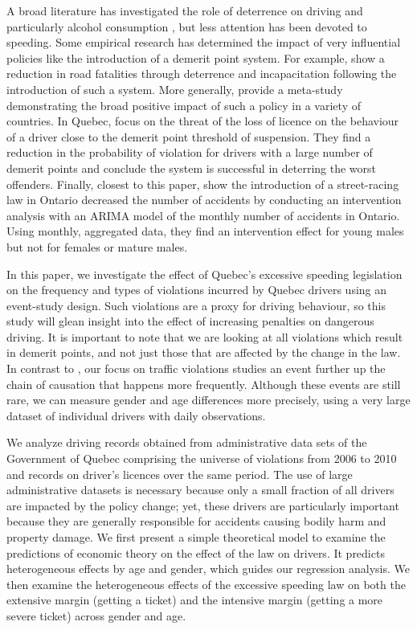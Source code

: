 \documentclass{cje}
\begin{document}
A broad literature has investigated the role of deterrence on driving 
and particularly alcohol consumption 
\citep[e.g.][]{hansen2015}, 
but less attention has been devoted to speeding. 
Some empirical research has determined the impact of very influential policies 
like the introduction of a demerit point system. 
For example, 
\citet{bennedittiniNicita2009} 
show a reduction in road fatalities 
through deterrence and incapacitation following the introduction of such a system. 
More generally, 
\citet{castillocastro2012} 
provide a meta-study 
demonstrating the broad positive impact of such a policy in a variety of countries. 
In Quebec, 
\citet{dionneetal2011} 
focus on the threat of the loss of licence 
on the behaviour of a driver close to the demerit point threshold of suspension. 
They find a reduction in the probability of violation for drivers 
with a large number of demerit points and conclude 
the system is successful in deterring the worst offenders. 
Finally, closest to this paper, 
\citet{meirambayeva2014} 
show the introduction of a street-racing law in Ontario decreased the number of accidents 
by conducting an intervention analysis with an ARIMA model of 
the monthly number of accidents in Ontario.
%
Using monthly, aggregated data, 
they find an intervention effect for young males
but not for females or mature males. 


In this paper, we investigate the effect of Quebec’s excessive speeding legislation
on the frequency and types of violations incurred by Quebec drivers 
using an event-study design. 
Such violations are a proxy for driving behaviour, 
so this study will glean insight into the effect of increasing penalties on dangerous driving. 
It is important to note that we are looking at all violations which result in demerit points, 
and not just those that are affected by the change in the law. 
% 
In contrast to \citet{meirambayeva2014}, 
our focus on traffic violations
studies an event further up the chain of causation that happens more frequently. 
Although these events are still rare,
we can measure gender and age differences more precisely, 
using a very large dataset of individual drivers with daily observations. 

We analyze driving records obtained from administrative data sets 
of the Government of Quebec comprising the universe of violations 
from 2006 to 2010 and records on driver's licences over the same period. 
The use of large administrative datasets is necessary because only a small fraction 
of all drivers are impacted by the policy change; 
yet, these drivers are particularly important because they are 
generally responsible for accidents causing bodily harm and property damage. 
% 
We first present a simple theoretical model to examine the predictions of economic theory 
on the effect of the law on drivers.
%
It predicts heterogeneous effects by age and gender,  
which guides our regression analysis. 
% 
We then examine the heterogeneous effects of the excessive speeding law 
on both the extensive margin (getting a ticket) 
and the intensive margin (getting a more severe ticket) across gender and age. 
\end{document}
